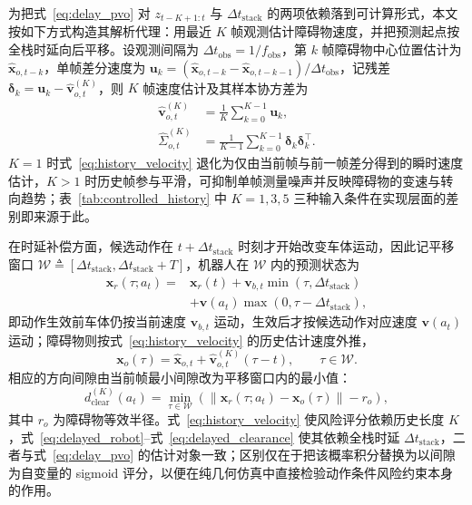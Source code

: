 \documentclass[UTF8,10pt,a4paper,twocolumn]{ctexart}
\begin{document}
为把式~\ref{eq:delay_pvo} 对 $z_{t-K+1:t}$ 与 $\Delta t_{\mathrm{stack}}$ 的两项依赖落到可计算形式，本文按如下方式构造其解析代理：用最近 $K$ 帧观测估计障碍物速度，并把预测起点按全栈时延向后平移。设观测间隔为 $\Delta t_{\mathrm{obs}}=1/f_{\mathrm{obs}}$，第 $k$ 帧障碍物中心位置估计为 $\hat{\mathbf x}_{o,t-k}$，单帧差分速度为 $\mathbf u_k=(\hat{\mathbf x}_{o,t-k}-\hat{\mathbf x}_{o,t-k-1})/\Delta t_{\mathrm{obs}}$，记残差 $\boldsymbol\delta_k=\mathbf u_k-\hat{\mathbf v}^{(K)}_{o,t}$，则 $K$ 帧速度估计及其样本协方差为
\begin{equation}
\begin{aligned}
    \hat{\mathbf v}^{(K)}_{o,t}
    &=\frac{1}{K}\sum_{k=0}^{K-1}\mathbf u_k,\\
    \hat{\Sigma}^{(K)}_{o,t}
    &=\frac{1}{K-1}\sum_{k=0}^{K-1}
    \boldsymbol\delta_k\boldsymbol\delta_k^{\!\top}.
\end{aligned}
    \label{eq:history_velocity}
\end{equation}
$K=1$ 时式~\ref{eq:history_velocity} 退化为仅由当前帧与前一帧差分得到的瞬时速度估计，$K>1$ 时历史帧参与平滑，可抑制单帧测量噪声并反映障碍物的变速与转向趋势；表~\ref{tab:controlled_history} 中 $K=1,3,5$ 三种输入条件在实现层面的差别即来源于此。

在时延补偿方面，候选动作在 $t+\Delta t_{\mathrm{stack}}$ 时刻才开始改变车体运动，因此记平移窗口 $\mathcal W\triangleq[\Delta t_{\mathrm{stack}},\Delta t_{\mathrm{stack}}+T]$，机器人在 $\mathcal W$ 内的预测状态为
\begin{equation}
\begin{aligned}
    \mathbf x_r(\tau;a_t)={}&\mathbf x_r(t)
    +\mathbf v_{b,t}\min\!\left(\tau,\Delta t_{\mathrm{stack}}\right)\\
    &+\mathbf v(a_t)\max\!\left(0,\tau-\Delta t_{\mathrm{stack}}\right),
\end{aligned}
    \label{eq:delayed_robot}
\end{equation}
即动作生效前车体仍按当前速度 $\mathbf v_{b,t}$ 运动，生效后才按候选动作对应速度 $\mathbf v(a_t)$ 运动；障碍物则按式~\ref{eq:history_velocity} 的历史估计速度外推，
\begin{equation}
    \mathbf x_o(\tau)=\hat{\mathbf x}_{o,t}+\hat{\mathbf v}^{(K)}_{o,t}(\tau-t),
    \qquad \tau\in\mathcal W.
    \label{eq:delayed_obstacle}
\end{equation}
相应的方向间隙由当前帧最小间隙改为平移窗口内的最小值：
\begin{equation}
    d^{(K)}_{\mathrm{clear}}(a_t)=
    \min_{\tau\in\mathcal W}
    \left(\left\|\mathbf x_r(\tau;a_t)-\mathbf x_o(\tau)\right\|-r_o\right),
    \label{eq:delayed_clearance}
\end{equation}
其中 $r_o$ 为障碍物等效半径。式~\ref{eq:history_velocity} 使风险评分依赖历史长度 $K$，式~\ref{eq:delayed_robot}--式~\ref{eq:delayed_clearance} 使其依赖全栈时延 $\Delta t_{\mathrm{stack}}$，二者与式~\ref{eq:delay_pvo} 的估计对象一致；区别仅在于把该概率积分替换为以间隙为自变量的 sigmoid 评分，以便在纯几何仿真中直接检验动作条件风险约束本身的作用。
\end{document}
